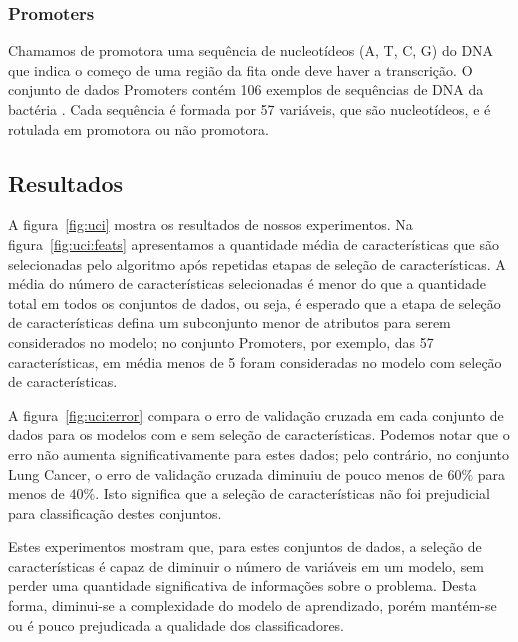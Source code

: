\subsubsection{Promoters}
Chamamos de promotora uma sequência de nucleotídeos (A, T, C, G) do DNA 
que indica o começo de uma região da fita onde deve haver a transcrição. 
O conjunto de dados Promoters contém 106 exemplos de sequências de DNA 
da bactéria . Cada sequência é formada por 57 
variáveis, que são nucleotídeos, e é rotulada em promotora ou não 
promotora.

\subsection{Resultados}
A figura~\ref{fig:uci} mostra os resultados de nossos experimentos.
Na figura~\ref{fig:uci:feats} apresentamos a quantidade média de 
características que são selecionadas pelo algoritmo  após
repetidas etapas de seleção de características. A média do número de 
características selecionadas é menor do que a quantidade total em todos 
os conjuntos de dados, ou seja, é esperado que a etapa de seleção
de características defina um subconjunto menor de atributos para 
serem considerados no modelo; no conjunto Promoters, por exemplo, das 
57 características, em média menos de 5 foram consideradas no modelo 
com seleção de características.

A figura~\ref{fig:uci:error} compara o erro de validação cruzada em cada
conjunto de dados para os modelos com e sem seleção de características.
Podemos notar que o erro não aumenta significativamente para estes 
dados; pelo contrário, no conjunto Lung Cancer, o erro de validação 
cruzada diminuiu de pouco menos de $60\%$ para menos de $40\%$. Isto
significa que a seleção de características não foi prejudicial para
classificação destes conjuntos.

Estes experimentos mostram que, para estes conjuntos de 
dados, a seleção de características é capaz de diminuir o número de 
variáveis em um modelo, sem perder uma quantidade significativa de 
informações sobre o problema. Desta forma, diminui-se a complexidade do
modelo de aprendizado, porém mantém-se ou é pouco prejudicada a 
qualidade dos classificadores.

